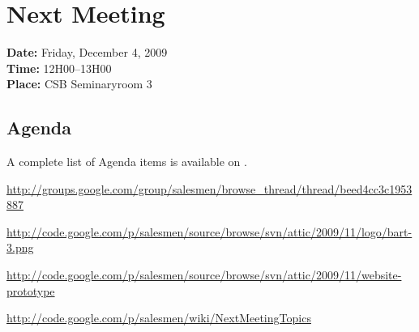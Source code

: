 \documentclass[a4paper, 12pt]{article}
\begin{document}
	\section{Next Meeting}

		\textbf{Date:} Friday, December 4, 2009\\
		\textbf{Time:} 12H00--13H00\\
		\textbf{Place:} CSB Seminaryroom 3\\
	
		\subsection{Agenda}
A complete list of Agenda items is available on \cite{site6}.\\
	
	\begin{thebibliography}{99}
		\href{http://groups.google.com/group/salesmen/browse\_{}thread/thread/beed4cc3c1953887}{http://groups.google.com/group/salesmen/browse\_{}thread/thread/beed4cc3c1953887}
		
			\href{http://code.google.com/p/salesmen/source/browse/svn/attic/2009/11/logo/bart-3.png}{http://code.google.com/p/salesmen/source/browse/svn/attic/2009/11/logo/bart-3.png}
		
			\href{http://code.google.com/p/salesmen/source/browse/svn/attic/2009/11/website-prototype}{http://code.google.com/p/salesmen/source/browse/svn/attic/2009/11/website-prototype}
		
		\href{http://code.google.com/p/salesmen/wiki/NextMeetingTopics}{http://code.google.com/p/salesmen/wiki/NextMeetingTopics}

		
	\end{thebibliography}	
		
\end{document}
